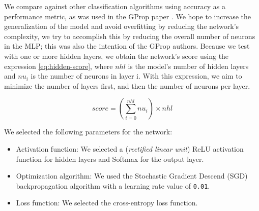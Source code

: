 \documentclass[runningheads]{llncs}
\begin{document}

We compare against other classification algorithms using accuracy as a
performance metric, as was used in the GProp paper \cite{g-prop}. We hope to
increase the generalization of the model and avoid overfitting by reducing the
network's complexity, we try to accomplish this by reducing the
overall number of neurons in the MLP; this was also the intention of the GProp
authors. Because we test with one or more hidden layers, we obtain the network's
score using the expression \autoref{eq:hidden-score}, where $nhl$ is the model's
number of hidden layers and $nu_{i}$ is the number of neurons in layer {i}. With
this expression, we aim to minimize the number of layers first, and then the number of
neurons per layer.


\begin{equation}
  score = (\sum_{i=0}^{nhl} nu_{i}) \times nhl
\end{equation}




We selected the following parameters for the network:

\begin{itemize}
\item Activation function: We selected a (\emph{rectified linear unit}) ReLU 
      activation function for hidden layers and Softmax for the output layer.
\item Optimization algorithm: We used the Stochastic Gradient Descend 
      (SGD) backpropagation algorithm with a learning rate value of \texttt{0.01}.
\item Loss function: We selected the cross-entropy loss function.
\end{itemize}
\end{document}
